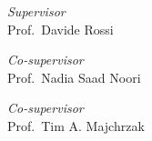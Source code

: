\documentclass[../thesis.tex]{subfiles}
\begin{document}
    \begin{titlepage}
        \begin{center}
            \begin{Large}
                \textbf{\myUni}\\
            \end{Large}

            \vspace{10pt}

            \begin{large}
                \textsc{\myDepartment}\\
                \textsc{\myFaculty}\\
            \end{large}

            \vspace{10pt}

            \begin{LARGE}
                \begin{center}
                    \textbf{\myTitle}\\
                \end{center}
            \end{LARGE}

            \begin{large}
                \textsl{\myDegree}\\
            \end{large}

            \vspace{100pt}

            \begin{large}
                \begin{flushleft}
                    \textit{Supervisor}\\
                    \vspace{1pt}
                    Prof.\ Davide Rossi
                \end{flushleft}
                \begin{flushleft}
                    \textit{Co-supervisor}\\
                    \vspace{1pt}
                    Prof.\ Nadia Saad Noori
                \end{flushleft}
                \begin{flushleft}
                    \textit{Co-supervisor}\\
                    \vspace{1pt}
                    Prof.\ Tim A. Majchrzak
                \end{flushleft}
            

\end{large}
\end{center}
\end{titlepage}
\end{document}
